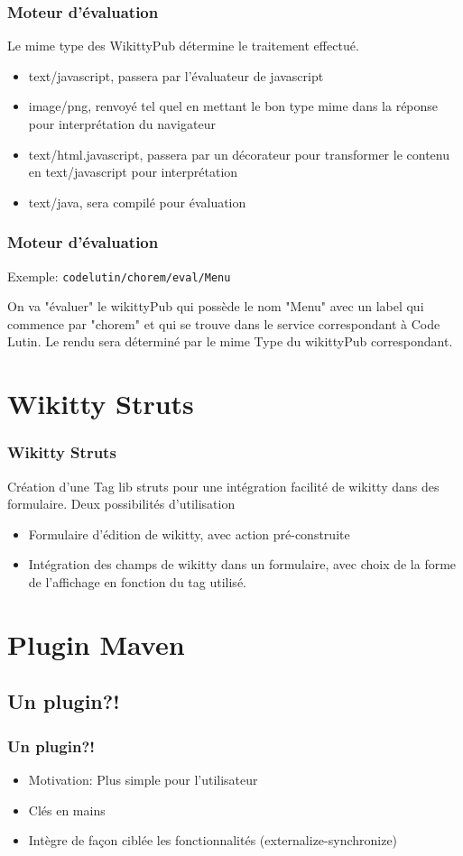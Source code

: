\documentclass[12pt,a4paper,utf8x]{beamer}
\begin{document}
\begin{frame}\frametitle{Moteur d'évaluation}
Le mime type des WikittyPub détermine le traitement effectué.
\begin{itemize}
\item text/javascript, passera par l'évaluateur de javascript
\item image/png, renvoyé tel quel en mettant le bon type mime dans la réponse 
pour interprétation du navigateur
\item text/html.javascript, passera par un décorateur pour transformer le contenu
en text/javascript pour interprétation
\item text/java, sera compilé pour évaluation
\end{itemize}
\end{frame}

\begin{frame}\frametitle{Moteur d'évaluation}

Exemple:
\verb!codelutin/chorem/eval/Menu! 

On va "évaluer" le wikittyPub qui possède le nom "Menu" avec un label qui
commence par "chorem" et qui se trouve dans le service correspondant à Code Lutin.
Le rendu sera déterminé par le mime Type du wikittyPub correspondant.
\end{frame}





\section*{Wikitty Struts} 
\begin{frame}\frametitle{Wikitty Struts}
Création d'une Tag lib struts pour une intégration facilité de wikitty dans des 
formulaire.
Deux possibilités d'utilisation
\begin{itemize}
\item Formulaire d'édition de wikitty, avec action pré-construite 
\item Intégration des champs de wikitty dans un formulaire, avec choix de la forme
de l'affichage en fonction du tag utilisé.
\end{itemize}

\end{frame}


\section{Plugin Maven}
\subsection*{Un plugin?!}
\begin{frame}\frametitle{Un plugin?!}
\begin{itemize}
\item Motivation: Plus simple pour l'utilisateur
\item Clés en mains
\item Intègre de façon ciblée les fonctionnalités (externalize-synchronize)
\end{itemize}
\end{frame}	
\end{document}
